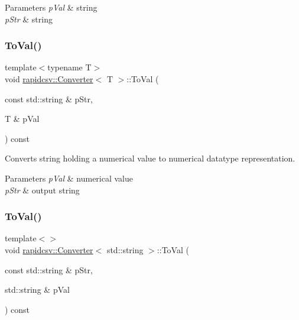 \begin{DoxyParams}{Parameters}
{\em p\+Val} & string \\
\hline
{\em p\+Str} & string \\
\hline
\end{DoxyParams}
\mbox{\label{classrapidcsv_1_1Converter_a827c54e8cbe86cdb8e315d3382dfcbba}} 
\subsubsection{\texorpdfstring{To\+Val()}{ToVal()}\hspace{0.1cm}{\footnotesize\ttfamily [1/2]}}
{\footnotesize\ttfamily template$<$typename T$>$ \\
void \hyperlink{classrapidcsv_1_1Converter}{rapidcsv\+::\+Converter}$<$ T $>$\+::To\+Val (\begin{DoxyParamCaption}\item[{const std\+::string \&}]{p\+Str,  }\item[{T \&}]{p\+Val }\end{DoxyParamCaption}) const\hspace{0.3cm}{\ttfamily [inline]}}



Converts string holding a numerical value to numerical datatype representation. 


\begin{DoxyParams}{Parameters}
{\em p\+Val} & numerical value \\
\hline
{\em p\+Str} & output string \\
\hline
\end{DoxyParams}
\mbox{\label{classrapidcsv_1_1Converter_aa038d308c460903344c0c2ebc5251537}} 
\subsubsection{\texorpdfstring{To\+Val()}{ToVal()}\hspace{0.1cm}{\footnotesize\ttfamily [2/2]}}
{\footnotesize\ttfamily template$<$$>$ \\
void \hyperlink{classrapidcsv_1_1Converter}{rapidcsv\+::\+Converter}$<$ std\+::string $>$\+::To\+Val (\begin{DoxyParamCaption}\item[{const std\+::string \&}]{p\+Str,  }\item[{std\+::string \&}]{p\+Val }\end{DoxyParamCaption}) const\hspace{0.3cm}{\ttfamily [inline]}}



